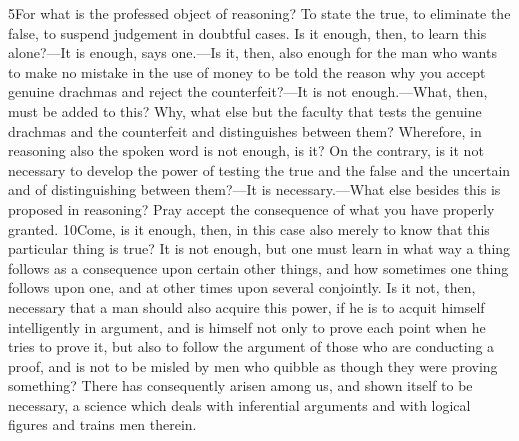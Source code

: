 5For what is the professed object of reasoning? To state the true, to eliminate the false, to suspend judgement in doubtful cases. Is it enough, then, to learn this alone?—It is enough, says one.—Is it, then, also enough for the man who wants to make no mistake in the use of money to be told the reason why you accept genuine drachmas and reject the counterfeit?—It is not enough.—What, then, must be added to this? Why, what else but the faculty that tests the genuine drachmas and the counterfeit and distinguishes between them? Wherefore, in reasoning also the spoken word is not enough, is it? On the contrary, is it not necessary to develop the power of testing the true and the false and the uncertain and of distinguishing between them?—It is necessary.—What else besides this is proposed in reasoning? Pray accept the consequence of what you have properly granted. 10Come, is it enough, then, in this case also merely to know that this particular thing is true? It is not enough, but one must learn in what way a thing follows as a consequence upon certain other things, and how sometimes one thing follows upon one, and at other times upon several conjointly. Is it not, then, necessary that a man should also acquire this power, if he is to acquit himself intelligently in argument, and is himself not only to prove each point when he tries to prove it, but also to follow the argument of those who are conducting a proof, and is not to be misled by men who quibble as though they were proving something? There has consequently arisen among us, and shown itself to be necessary, a science which deals with inferential arguments and with logical figures and trains men therein.

